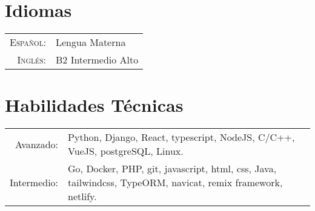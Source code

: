 \documentclass[a4paper,10pt]{article} %
\begin{document}

\section{Idiomas}

\begin{tabular}{rl}
    \textsc{Espa\~nol:} & Lengua Materna\\

    \textsc{Ingl\'es:} & B2 Intermedio Alto\\
\end{tabular}


\section{Habilidades T\'ecnicas}

\begin{tabular}{rl}
    Avanzado: & Python, Django, React, typescript, NodeJS, C/C++, VueJS, postgreSQL, Linux.\\
    Intermedio: & \parbox[t]{0.8\textwidth}{Go, Docker, PHP, git, javascript, html, css, Java, tailwindcss, TypeORM, navicat, remix framework, netlify.}\\
\end{tabular}


%

\end{document}
